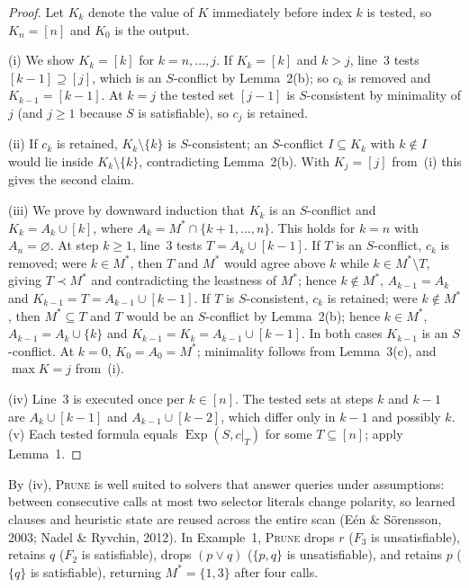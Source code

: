 \documentclass[11pt,reqno]{amsart}
\theoremstyle{plain}
\theoremstyle{definition}
\DeclareMathOperator{\Exp}{Exp}
\newcommand{\Mstar}{M^{*}}
\newcommand{\PRUNE}{\textsc{Prune}}
\begin{document}
\begin{proof}
Let $K_k$ denote the value of $K$ immediately before index $k$ is tested, so
$K_n=[n]$ and $K_0$ is the output.

(i) We show $K_k=[k]$ for $k=n,\dots,j$. If $K_k=[k]$ and $k>j$, line~3 tests
$[k-1]\supseteq[j]$, which is an $S$-conflict by Lemma~2(b); so $c_k$ is removed and
$K_{k-1}=[k-1]$. At $k=j$ the tested set $[j-1]$ is $S$-consistent by minimality of
$j$ (and $j\ge1$ because $S$ is satisfiable), so $c_j$ is retained.

(ii) If $c_k$ is retained, $K_k\setminus\{k\}$ is $S$-consistent; an $S$-conflict
$I\subseteq K_k$ with $k\notin I$ would lie inside $K_k\setminus\{k\}$,
contradicting Lemma~2(b). With $K_j=[j]$ from~(i) this gives the second claim.

(iii) We prove by downward induction that $K_k$ is an $S$-conflict and
$K_k=A_k\cup[k]$, where $A_k=\Mstar\cap\{k+1,\dots,n\}$. This holds for $k=n$ with
$A_n=\varnothing$. At step $k\ge1$, line~3 tests $T=A_k\cup[k-1]$. If $T$ is an
$S$-conflict, $c_k$ is removed; were $k\in\Mstar$, then $T$ and $\Mstar$ would agree
above $k$ while $k\in\Mstar\setminus T$, giving $T\prec\Mstar$ and contradicting the
leastness of $\Mstar$; hence $k\notin\Mstar$, $A_{k-1}=A_k$ and
$K_{k-1}=T=A_{k-1}\cup[k-1]$. If $T$ is $S$-consistent, $c_k$ is retained; were
$k\notin\Mstar$, then $\Mstar\subseteq T$ and $T$ would be an $S$-conflict by
Lemma~2(b); hence $k\in\Mstar$, $A_{k-1}=A_k\cup\{k\}$ and
$K_{k-1}=K_k=A_{k-1}\cup[k-1]$. In both cases $K_{k-1}$ is an $S$-conflict. At
$k=0$, $K_0=A_0=\Mstar$; minimality follows from Lemma~3(c), and $\max K=j$ from~(i).

(iv) Line~3 is executed once per $k\in[n]$. The tested sets at steps $k$ and $k-1$
are $A_k\cup[k-1]$ and $A_{k-1}\cup[k-2]$, which differ only in $k-1$ and possibly
$k$. (v) Each tested formula equals $\Exp(S,c|_T)$ for some $T\subseteq[n]$; apply
Lemma~1.
\end{proof}

By (iv), \PRUNE{} is well suited to solvers that answer queries under assumptions:
between consecutive calls at most two selector literals change polarity, so learned
clauses and heuristic state are reused across the entire scan (E\'en \&
S\"orensson, 2003; Nadel \& Ryvchin, 2012). In Example~1, \PRUNE{} drops $r$ ($F_3$
is unsatisfiable), retains $q$ ($F_2$ is satisfiable), drops $(p\vee q)$ ($\{p,q\}$
is unsatisfiable), and retains $p$ ($\{q\}$ is satisfiable), returning
$\Mstar=\{1,3\}$ after four calls.
\end{document}
